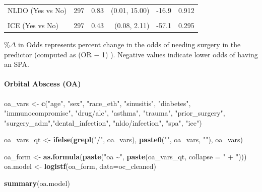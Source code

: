 \documentclass[
]{article}
\newenvironment{Shaded}{\begin{snugshade}}{\end{snugshade}}
\newcommand{\AttributeTok}[1]{\textcolor[rgb]{0.13,0.29,0.53}{#1}}
\newcommand{\FunctionTok}[1]{\textcolor[rgb]{0.13,0.29,0.53}{\textbf{#1}}}
\newcommand{\NormalTok}[1]{#1}
\newcommand{\OtherTok}[1]{\textcolor[rgb]{0.56,0.35,0.01}{#1}}
\newcommand{\StringTok}[1]{\textcolor[rgb]{0.31,0.60,0.02}{#1}}
\begin{document}
\begin{table}[t]
\begin{tabular*}{0.85\linewidth}{@{\extracolsep{\fill}}lrrrrr}
NLDO (Yes vs No) & 297 & 0.83 & (0.01, 15.00) & -16.9 & 0.912 \\ 
{\cellcolor[HTML]{FFF3CD}{OA (Yes vs No)}} & {\cellcolor[HTML]{FFF3CD}{297}} & {\cellcolor[HTML]{FFF3CD}{0.03}} & {\cellcolor[HTML]{FFF3CD}{(0.00, 0.21)}} & {\cellcolor[HTML]{FFF3CD}{-97.3}} & {\cellcolor[HTML]{FFF3CD}{<0.001}} \\ 
ICE (Yes vs No) & 297 & 0.43 & (0.08, 2.11) & -57.1 & 0.295 \\ 
\bottomrule
\end{tabular*}
\begin{minipage}{\linewidth}
\%\ensuremath{\Delta} in Odds represents percent change in the odds of needing surgery
    in the predictor (computed as (OR \ensuremath{-} 1) ). Negative values indicate lower
    odds of having an SPA.\\
\end{minipage}
\end{table}

\paragraph{Orbital Abscess (OA)}\label{orbital-abscess-oa}

\begin{Shaded}
\begin{Highlighting}[]
\NormalTok{oa\_vars }\OtherTok{\textless{}{-}} \FunctionTok{c}\NormalTok{(}\StringTok{"age"}\NormalTok{, }\StringTok{"sex"}\NormalTok{, }\StringTok{"race\_eth"}\NormalTok{, }\StringTok{"sinusitis"}\NormalTok{, }\StringTok{"diabetes"}\NormalTok{,}
              \StringTok{"immunocompromise"}\NormalTok{, }\StringTok{"drug/alc"}\NormalTok{, }\StringTok{"asthma"}\NormalTok{, }\StringTok{"trauma"}\NormalTok{, }
              \StringTok{"prior\_surgery"}\NormalTok{, }\StringTok{"surgery\_adm"}\NormalTok{,}\StringTok{"dental\_infection"}\NormalTok{,}
              \StringTok{"nldo/infection"}\NormalTok{, }\StringTok{"spa"}\NormalTok{, }\StringTok{"ice"}\NormalTok{)}

\NormalTok{oa\_vars\_qt }\OtherTok{\textless{}{-}} \FunctionTok{ifelse}\NormalTok{(}\FunctionTok{grepl}\NormalTok{(}\StringTok{"/"}\NormalTok{, oa\_vars), }
                      \FunctionTok{paste0}\NormalTok{(}\StringTok{"\textasciigrave{}"}\NormalTok{, oa\_vars, }\StringTok{"\textasciigrave{}"}\NormalTok{), oa\_vars)}

\NormalTok{oa\_form }\OtherTok{\textless{}{-}} \FunctionTok{as.formula}\NormalTok{(}\FunctionTok{paste}\NormalTok{(}\StringTok{"oa \textasciitilde{}"}\NormalTok{, }\FunctionTok{paste}\NormalTok{(oa\_vars\_qt, }\AttributeTok{collapse =} \StringTok{" + "}\NormalTok{)))}
\NormalTok{oa.model }\OtherTok{\textless{}{-}} \FunctionTok{logistf}\NormalTok{(oa\_form, }\AttributeTok{data=}\NormalTok{oc\_cleaned)}

\FunctionTok{summary}\NormalTok{(oa.model)}
\end{Highlighting}
\end{Shaded}
\end{document}
